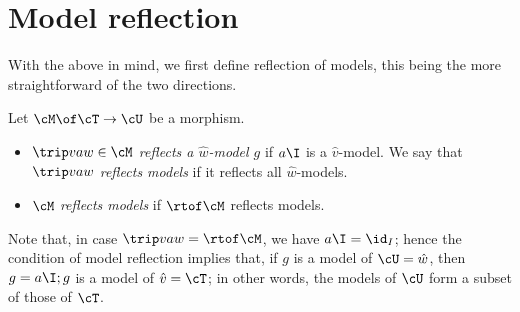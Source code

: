\section{Model reflection}
\label{sec:reflection}

With the above in mind, we first define reflection of models, this being the more straightforward of the two directions.

\begin{definition}
Let $\cM\of \cT\to\cU$ be a morphism.
\begin{itemize}[topsep=\itemsep]
\item $\trip vaw\in\cM$ \emph{reflects a $\hat w$-model $g$} if $a\I$ is a $\hat v$-model. We say that $\trip vaw$ \emph{reflects models} if it reflects all $\hat w$-models.

\item $\cM$ \emph{reflects models} if $\rtof\cM$ reflects models.
\end{itemize}
\end{definition}


\begin{comment}
\begin{definition}[model reflection]
Let $\cM\of \cT\to\cU$ be a morphism.
\begin{itemize}[topsep=\itemsep]
\item $\trip vaw\in\cM$ \emph{reflects a $\hat w$-model $g$} if there is a sibling $v'\sibling v$ with a morphism $s:I_{v'}\to I_v$ such that $u_{v'}=s;u_v$ and $s;a\I;g\sat \hat v'$. We say that $\trip vaw$ \emph{reflects models} if it reflects all $\hat w$-models.

\item $\cM$ \emph{reflects models} if $\rtof\cM$ reflects models.
\end{itemize}
\end{definition}
\end{comment}
%
Note that, in case $\trip vaw=\rtof\cM$, we have $a\I=\id_I$; hence the condition of model reflection implies that, if $g$ is a model of $\cU=\hat w$, then $g=a\I;g$ is a model of $\hat v=\cT$; in other words, the models of $\cU$ form a subset of those of $\cT$.


